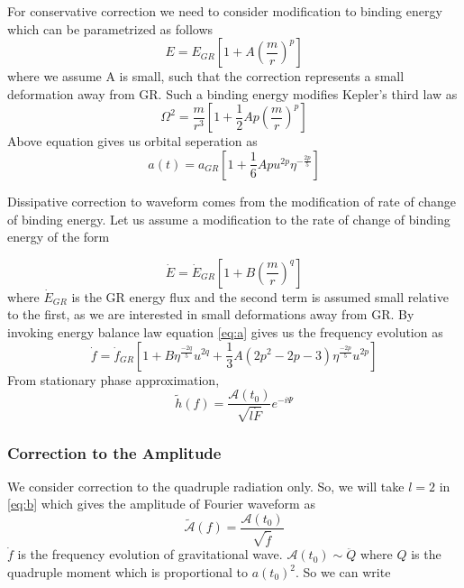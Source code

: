 \documentclass[11pt]{article}
\begin{document}
\hspace*{15.5pt}For conservative correction we need to consider modification to binding energy which can be parametrized as follows\cite{Chatziioannou:2012rf}
 \begin{equation}
 E=E_{GR}[1+A(\frac{m}{r})^p]
 \end{equation}
 where we assume A is small, such that the correction represents a small deformation away from GR. Such a binding energy modifies Kepler’s third law as
 \begin{equation}
 \Omega^2=\frac{m}{r^3} [1+\frac{1}{2} Ap(\frac{m}{r})^p]
 \end{equation}
  Above equation gives us orbital seperation as
 \begin{equation}\label{eq:g}
 a(t)=a_{GR}[1+\frac{1}{6}Apu^{2p}\eta^{-\frac{2p}{5}}]
 \end{equation}
 
 \hspace*{15.5pt}Dissipative correction to waveform comes from the modification of rate of change of binding energy. Let us assume a modification to the rate of change of binding energy of the form\cite{Chatziioannou:2012rf}
 
 \begin{equation}\label{eq:a}
 \dot{E}=\dot{E}_{GR}[1+B(\frac{m}{r})^q]
 \end{equation}
 where $\dot{E}_{GR}$ is the GR energy flux and the second term is assumed small relative to the first, as we are interested in small deformations away from GR. By invoking energy balance law equation \eqref{eq:a} gives us the frequency evolution as 
 \begin{equation}\label{eq:f}
 \dot{f}=\dot{f}_{GR}[1+B\eta^\frac{-2q}{5} u^{2q}+\frac{1}{3}A(2p^2-2p-3)\eta^{\frac{-2p}{5}}u^{2p}]
 \end{equation}\label{eq:e}
 \hspace{15.5pt}From stationary phase approximation\cite{Yunes:2009yz},
 \begin{equation}\label{eq:b}
 \tilde{h}(f)=\frac{\mathcal{A}(t_0)}{\sqrt{l\dot{F}}}e^{-i\Psi}
 \end{equation}
 \subsubsection*{Correction to the Amplitude}
\hspace*{15.5pt}We consider correction to the quadruple radiation only. So, we will take $l=2$ in \eqref{eq:b} which gives the amplitude of Fourier waveform as
\begin{equation}\label{eq:c}
\tilde{\mathcal{A}}(f)=\frac{\mathcal{A}(t_0)}{\sqrt{\dot{f}}}
\end{equation}
$\dot{f}$ is the frequency evolution of gravitational wave. $\mathcal{A}(t_0)\sim\ddot{Q}$ where $Q$ is the quadruple moment which is proportional to ${a(t_0)}^2$. So we can write
\end{document}
